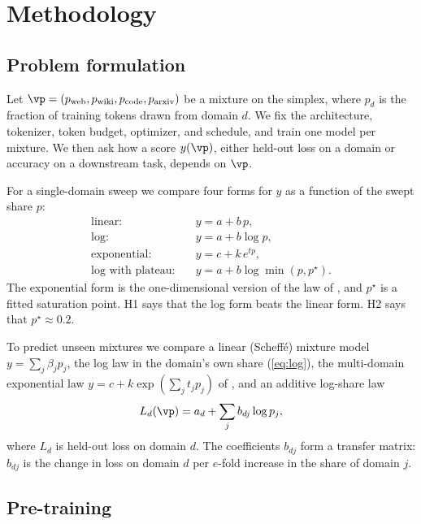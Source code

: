 \section{Methodology}
\label{sec:method}

\subsection{Problem formulation}

Let $\vp = (p_{\text{web}}, p_{\text{wiki}}, p_{\text{code}}, p_{\text{arxiv}})$ be a mixture on the simplex, where $p_d$ is the fraction of training tokens drawn from domain $d$.
We fix the architecture, tokenizer, token budget, optimizer, and schedule, and train one model per mixture.
We then ask how a score $y(\vp)$, either held-out loss on a domain or accuracy on a downstream task, depends on $\vp$.

For a single-domain sweep we compare four forms for $y$ as a function of the swept share $p$:
\begin{align}
\text{linear:} \quad & y = a + b\,p, \\
\text{log:} \quad & y = a + b \log p, \label{eq:log} \\
\text{exponential:} \quad & y = c + k\,e^{t p}, \\
\text{log with plateau:} \quad & y = a + b \log \min(p, p^{\star}).
\end{align}
The exponential form is the one-dimensional version of the law of \citet{ye2025datamixing}, and $p^{\star}$ is a fitted saturation point.
H1 says that the log form beats the linear form.
H2 says that $p^{\star} \approx 0.2$.

To predict unseen mixtures we compare a linear (Scheff\'e) mixture model $y = \sum_j \beta_j p_j$, the log law in the domain's own share (\eqref{eq:log}), the multi-domain exponential law $y = c + k \exp(\sum_j t_j p_j)$ of \citet{ye2025datamixing}, and an additive log-share law
\begin{equation}
L_d(\vp) = a_d + \sum_{j} b_{dj} \log p_j ,
\label{eq:additive}
\end{equation}
where $L_d$ is held-out loss on domain $d$.
The coefficients $b_{dj}$ form a transfer matrix: $b_{dj}$ is the change in loss on domain $d$ per $e$-fold increase in the share of domain $j$.

\subsection{Pre-training}

